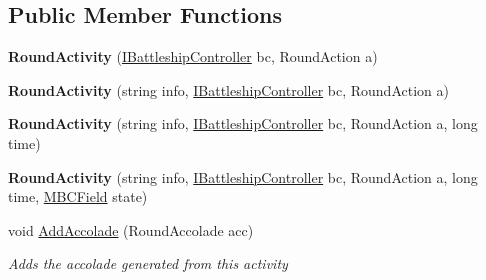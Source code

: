 \subsection*{Public Member Functions}
\begin{DoxyCompactItemize}
\item 
\hypertarget{class_m_b_c_1_1_core_1_1_m_b_c_round_log_1_1_round_activity_af0696f4cdae17aa997ea2f5d0a2890af}{{\bfseries Round\-Activity} (\hyperlink{interface_m_b_c_1_1_core_1_1_i_battleship_controller}{I\-Battleship\-Controller} bc, Round\-Action a)}\label{class_m_b_c_1_1_core_1_1_m_b_c_round_log_1_1_round_activity_af0696f4cdae17aa997ea2f5d0a2890af}

\item 
\hypertarget{class_m_b_c_1_1_core_1_1_m_b_c_round_log_1_1_round_activity_a66ee4adcaebb1841f0ac7672d452bc2c}{{\bfseries Round\-Activity} (string info, \hyperlink{interface_m_b_c_1_1_core_1_1_i_battleship_controller}{I\-Battleship\-Controller} bc, Round\-Action a)}\label{class_m_b_c_1_1_core_1_1_m_b_c_round_log_1_1_round_activity_a66ee4adcaebb1841f0ac7672d452bc2c}

\item 
\hypertarget{class_m_b_c_1_1_core_1_1_m_b_c_round_log_1_1_round_activity_abe423d14f1440d777764671e3624721f}{{\bfseries Round\-Activity} (string info, \hyperlink{interface_m_b_c_1_1_core_1_1_i_battleship_controller}{I\-Battleship\-Controller} bc, Round\-Action a, long time)}\label{class_m_b_c_1_1_core_1_1_m_b_c_round_log_1_1_round_activity_abe423d14f1440d777764671e3624721f}

\item 
\hypertarget{class_m_b_c_1_1_core_1_1_m_b_c_round_log_1_1_round_activity_aa6b84a8ccc2880be87715bbb916339c5}{{\bfseries Round\-Activity} (string info, \hyperlink{interface_m_b_c_1_1_core_1_1_i_battleship_controller}{I\-Battleship\-Controller} bc, Round\-Action a, long time, \hyperlink{class_m_b_c_1_1_core_1_1_m_b_c_field}{M\-B\-C\-Field} state)}\label{class_m_b_c_1_1_core_1_1_m_b_c_round_log_1_1_round_activity_aa6b84a8ccc2880be87715bbb916339c5}

\item 
\hypertarget{class_m_b_c_1_1_core_1_1_m_b_c_round_log_1_1_round_activity_a733fb8632f64e86b9f5aeba0794f4e8e}{void \hyperlink{class_m_b_c_1_1_core_1_1_m_b_c_round_log_1_1_round_activity_a733fb8632f64e86b9f5aeba0794f4e8e}{Add\-Accolade} (Round\-Accolade acc)}\label{class_m_b_c_1_1_core_1_1_m_b_c_round_log_1_1_round_activity_a733fb8632f64e86b9f5aeba0794f4e8e}

\begin{DoxyCompactList}\small\item\em Adds the accolade generated from this activity\end{DoxyCompactList}\end{DoxyCompactItemize}
